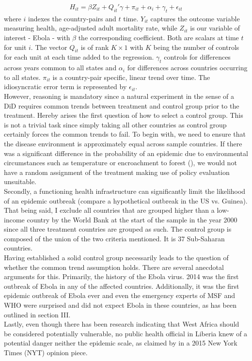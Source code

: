 \documentclass{article}
\begin{document}
\begin{align}
H_{it} =  \beta Z_{it} +  Q_{it}'\gamma + \pi_{it} + \alpha_i + \gamma_t + \epsilon_{it}
\end{align}
where $i$ indexes the country-pairs and $t$ time. $Y_{it}$ captures the outcome variable measuring health, age-adjusted adult mortality rate, while $Z_{it}$ is our variable of interest - Ebola - with $\beta$ the corresponding coefficient. Both are scalars at time $t$ for unit $i$. The vector $Q_{it}$ is of rank $K \times 1$ with $K$ being the number of controls for each unit at each time added to the regression. $\gamma_t$ controls for differences across years common to all states and $\alpha_i$ for differences across countries occurring to all states. $\pi_{it}$ is a country-pair specific, linear trend over time. The idiosyncratic error term is represented by $\epsilon_{it}$. \\
However, reasoning is mandatory since a natural experiment in the sense of a DiD requires common trends between treatment and control group prior to the treatment. Hereby arises the first question of how to select a control group. This is not a trivial task since simply taking all other countries as control group certainly forces the common trends to fail. To begin with, we need to ensure that the disease environment is approximately equal across sample countries. If there was a significant difference in the probability of an epidemic due to environmental circumstances such as temperature or encroachment to forest (\cite{alexander2015factors}), we would not have a random assignment of the treatment making use of policy evaluation unsuitable.\\
Secondly, a functioning health infrastructure can significantly limit the likelihood of an epidemic outbreak (compare a hypothetical outbreak in the US vs. Guinea). That being said, I exclude all countries that are grouped higher than a low-income country by the World Bank at the start of the sample in the year 2000 since all three treatment countries are grouped as such. The control group is composed of the union of the two criteria mentioned. It is 37 Sub-Saharan countries.\\
Having established a solid control group necessarily leads to the question of whether the common trend assumption holds. There are several anecdotal arguments for this. Primarily, the history of the Ebola virus. 2014 was the first outbreak of Ebola in any of the affected countries. Additionally, it was the first epidemic outbreak of Ebola ever and even the emergency experts of MSF and WHO were surprised and did not expect Ebola in these countries, as has been outlined in section III.\\
Lastly, even though there has been research indicating that West Africa should be considered potentially vulnerable, no public health official in Liberia knew of a potential danger neither the epidemic scale, as claimed by \cite{ebola2015nyt} in a 2015 New York Times (NYT) opinion piece.
\end{document}
